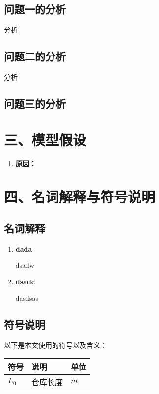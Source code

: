 \documentclass{my_paper}
\begin{document}
\subsection{问题一的分析}

分析

\subsection{问题二的分析}

分析

\subsection{问题三的分析}


\section{三、模型假设}
\begin{enumerate}
    \item 
    
    \textbf{原因：}


\end{enumerate}

\section{四、名词解释与符号说明}
\subsection{名词解释}
\begin{enumerate}
    \item \textbf{dada}
    
    dsadw
    
    \item \textbf{dsadc}
    
    dasdsas

    
\end{enumerate}
\subsection{符号说明}
以下是本文使用的符号以及含义：
\begin{table}[h]%
    \centering
    \begin{tabular}{p{2.0cm}<{\centering}p{9.0cm}<{\centering}p{2.0cm}<{\centering}}
    \hline
    符号 & 说明 & 单位 \\ %
    \hline
    $L_0$ & 仓库长度 &  $m$\\
    
    \hline
    \end{tabular}
\end{table}
\end{document}
